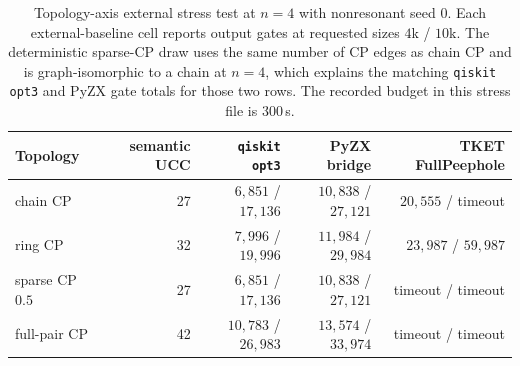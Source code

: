 \begin{table}[tbp]
\centering
\scriptsize
\begin{tabular}{@{}lrrrr@{}}
\toprule
Topology & semantic UCC & \texttt{qiskit opt3} & PyZX bridge & TKET FullPeephole \\
\midrule
chain CP & 27 & $6{,}851$ / $17{,}136$ & $10{,}838$ / $27{,}121$ & $20{,}555$ / timeout \\
ring CP & 32 & $7{,}996$ / $19{,}996$ & $11{,}984$ / $29{,}984$ & $23{,}987$ / $59{,}987$ \\
sparse CP $0.5$ & 27 & $6{,}851$ / $17{,}136$ & $10{,}838$ / $27{,}121$ & timeout / timeout \\
full-pair CP & 42 & $10{,}783$ / $26{,}983$ & $13{,}574$ / $33{,}974$ & timeout / timeout \\
\bottomrule
\end{tabular}
\caption{Topology-axis external stress test at $n=4$ with nonresonant seed $0$. Each external-baseline cell reports output gates at requested sizes $4$k / $10$k. The deterministic sparse-CP draw uses the same number of CP edges as chain CP and is graph-isomorphic to a chain at $n=4$, which explains the matching \texttt{qiskit opt3} and PyZX gate totals for those two rows. The recorded budget in this stress file is 300\,s.}
\label{tab:topology-external-stress}
\end{table}


